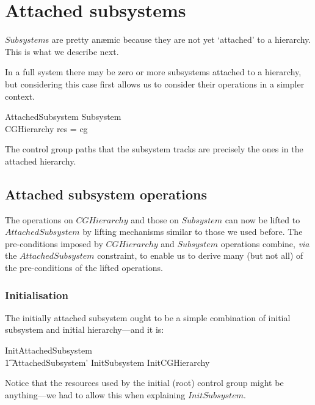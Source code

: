 \documentclass[a4paper,twoside,12pt]{article}
\begin{document}
\section{Attached subsystems}
\label{sec:attss}

$Subsystem$s are pretty an\ae{}mic because they are not yet `attached' to a hierarchy. This is what we describe next.

In a full system there may be zero or more subsystems attached to a hierarchy, but considering this case first allows us
to consider their operations in a simpler context.

\begin{schema}{AttachedSubsystem}
Subsystem \\
CGHierarchy
\where
\dom res = \dom cg
\end{schema}
The control group paths that the subsystem tracks are precisely the ones in
the attached hierarchy.

\subsection{Attached subsystem operations}
The operations on $CGHierarchy$ and those on $Subsystem$ can now be lifted to $AttachedSubsystem$
by lifting mechanisms similar to those we used before. The pre-conditions imposed
by $CGHierarchy$ and $Subsystem$ operations combine, \emph{via} the
$AttachedSubsystem$ constraint, to enable us to derive many (but not all) of the pre-conditions of the lifted operations.

\subsubsection{Initialisation}

The initially attached subsystem ought to be a simple combination of initial subsystem and initial hierarchy---and it is:

\begin{zed}
InitAttachedSubsystem  \\
\t1 AttachedSubsystem' \land InitSubsystem \land InitCGHierarchy
\end{zed}
Notice that the resources used by the initial (root) control group might be anything---we had to allow this when
explaining $InitSubsystem$.
\end{document}
